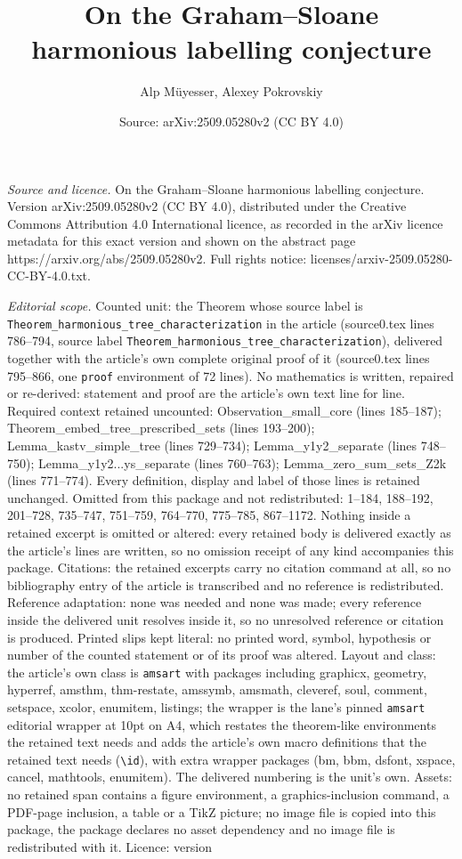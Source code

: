 \documentclass[10pt,a4paper]{amsart}
\title[On the Graham--Sloane harmonious labelling conjecture]{On the Graham--Sloane harmonious labelling conjecture}
\author{Alp M\"uyesser, Alexey Pokrovskiy}
\date{Source: arXiv:2509.05280v2 (CC BY 4.0)}
\begin{document}
\maketitle

\noindent\emph{Source and licence.} On the Graham--Sloane harmonious labelling conjecture. Version arXiv:2509.05280v2 (CC BY 4.0), distributed under the Creative Commons Attribution 4.0 International licence, as recorded in the arXiv licence metadata for this exact version and shown on the abstract page https://arxiv.org/abs/2509.05280v2. Full rights notice: licenses/arxiv-2509.05280-CC-BY-4.0.txt.\par\smallskip

\noindent\textit{Editorial scope.} Counted unit: the Theorem whose source label is \texttt{Theorem\_harmonious\_tree\_characterization} in the article (source0.tex lines 786--794, source label \texttt{Theorem\_harmonious\_tree\_characterization}), delivered together with the article's own complete original proof of it (source0.tex lines 795--866, one \texttt{proof} environment of 72 lines). No mathematics is written, repaired or re-derived: statement and proof are the article's own text line for line. Required context retained uncounted: Observation\_small\_core (lines 185--187); Theorem\_embed\_tree\_prescribed\_sets (lines 193--200); Lemma\_kastv\_simple\_tree (lines 729--734); Lemma\_y1y2\_separate (lines 748--750); Lemma\_y1y2...ys\_separate (lines 760--763); Lemma\_zero\_sum\_sets\_Z2k (lines 771--774). Every definition, display and label of those lines is retained unchanged. Omitted from this package and not redistributed: 1--184, 188--192, 201--728, 735--747, 751--759, 764--770, 775--785, 867--1172. Nothing inside a retained excerpt is omitted or altered: every retained body is delivered exactly as the article's lines are written, so no omission receipt of any kind accompanies this package. Citations: the retained excerpts carry no citation command at all, so no bibliography entry of the article is transcribed and no reference is redistributed. Reference adaptation: none was needed and none was made; every reference inside the delivered unit resolves inside it, so no unresolved reference or citation is produced. Printed slips kept literal: no printed word, symbol, hypothesis or number of the counted statement or of its proof was altered. Layout and class: the article's own class is \texttt{amsart} with packages including graphicx, geometry, hyperref, amsthm, thm-restate, amssymb, amsmath, cleveref, soul, comment, setspace, xcolor, enumitem, listings; the wrapper is the lane's pinned \texttt{amsart} editorial wrapper at 10pt on A4, which restates the theorem-like environments the retained text needs and adds the article's own macro definitions that the retained text needs (\texttt{\textbackslash id}), with extra wrapper packages (bm, bbm, dsfont, xspace, cancel, mathtools, enumitem). The delivered numbering is the unit's own. Assets: no retained span contains a figure environment, a graphics-inclusion command, a PDF-page inclusion, a table or a TikZ picture; no image file is copied into this package, the package declares no asset dependency and no image file is redistributed with it. Licence: version 
\end{document}
